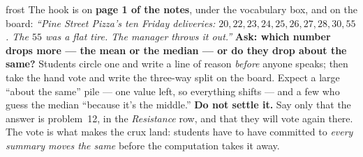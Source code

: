 \documentclass[10pt]{article}
\begin{document}
\boxguard
\begin{skillbox}{frost}
The hook is on \textbf{page 1 of the notes}, under the vocabulary box, and on the board:
\textit{``Pine Street Pizza's ten Friday deliveries: $20, 22, 23, 24, 25, 26, 27, 28, 30, 55$.
The $55$ was a flat tire. The manager throws it out.''} \textbf{Ask: which number drops more
--- the mean or the median --- or do they drop about the same?} Students circle one and write a
line of reason \emph{before} anyone speaks; then take the hand vote and write the three-way
split on the board. Expect a large ``about the same'' pile --- one value left, so everything
shifts --- and a few who guess the median ``because it's the middle.''
\textbf{Do not settle it.} Say only that the answer is problem~12, in the \emph{Resistance}
row, and that they will vote again there. The vote is what makes the crux land: students have
to have committed to \emph{every summary moves the same} before the computation takes it away.
\end{skillbox}
\end{document}
